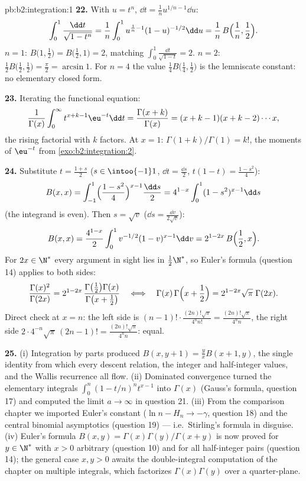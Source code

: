 \begin{solution}{pb:b2:integration:1}
\textbf{22.} With $u = t^n$, $\dd t = \frac1n u^{1/n - 1}\dd
u$:
\[
\int_0^1 \frac{\dd t}{\sqrt{1-t^n}}
= \frac1n\int_0^1 u^{\frac1n-1}(1-u)^{-1/2}\dd u
= \frac1n\,B\Bigl(\frac1n, \frac12\Bigr) .
\]
$n = 1$: $B\bigl(1,\frac12\bigr) = B\bigl(\frac12,1\bigr) = 2$,
matching $\int_0^1\frac{\dd t}{\sqrt{1-t}} = 2$. $n = 2$:
$\frac12 B\bigl(\frac12,\frac12\bigr) = \frac\pi2 = \arcsin 1$.
For $n = 4$ the value $\frac14 B\bigl(\frac14,\frac12\bigr)$ is
the lemniscate constant: no elementary closed form.

\textbf{23.} Iterating the functional equation:
\[
\frac{1}{\Gamma(x)}\int_0^\infty t^{x+k-1}\eu^{-t}\dd t
= \frac{\Gamma(x+k)}{\Gamma(x)}
= (x+k-1)(x+k-2)\cdots x ,
\]
the rising factorial with $k$ factors. At $x = 1$:
$\Gamma(1+k)/\Gamma(1) = k!$, the moments of $\eu^{-t}$ from
\cref{exo:b2:integration:2}.

\textbf{24.} Substitute $t = \frac{1+s}2$ ($s \in
\intoo{-1}1$, $\dd t = \frac{\dd s}2$, $t(1-t) =
\frac{1-s^2}4$):
\[
B(x,x) = \int_{-1}^{1}\Bigl(\frac{1-s^2}{4}\Bigr)^{x-1}
\frac{\dd s}{2}
= 4^{1-x}\int_0^1 (1-s^2)^{x-1}\dd s
\]
(the integrand is even). Then $s = \sqrt v$ ($\dd s =
\frac{\dd v}{2\sqrt v}$):
\[
B(x,x) = \frac{4^{1-x}}{2}\int_0^1
v^{-1/2}(1-v)^{x-1}\dd v
= 2^{1-2x}\,B\Bigl(\frac12, x\Bigr) .
\]
For $2x \in \N^*$ every argument in sight lies in
$\frac12\N^*$, so Euler's formula (question 14) applies to both
sides:
\[
\frac{\Gamma(x)^2}{\Gamma(2x)}
= 2^{1-2x}\,
\frac{\Gamma\bigl(\frac12\bigr)\Gamma(x)}
{\Gamma\bigl(x+\frac12\bigr)}
\quad\Longleftrightarrow\quad
\Gamma(x)\,\Gamma\Bigl(x+\frac12\Bigr)
= 2^{1-2x}\sqrt\pi\;\Gamma(2x) .
\]
Direct check at $x = n$: the left side is $(n-1)!\cdot
\frac{(2n)!\sqrt\pi}{4^n n!} = \frac{(2n)!\sqrt\pi}{4^n n}$,
the right side $2\cdot4^{-n}\sqrt\pi\,(2n-1)! =
\frac{(2n)!\sqrt\pi}{4^n n}$: equal.

\textbf{25.} (i) Integration by parts produced $B(x,y+1) =
\frac yx B(x+1,y)$, the single identity from which every
descent relation, the integer and half-integer values, and the
Wallis recurrence all flow. (ii) Dominated convergence turned
the elementary integrals $\int_0^n(1-t/n)^n t^{x-1}$ into
$\Gamma(x)$ (Gauss's formula, question 17) and computed the
limit $a \to \infty$ in question 21. (iii) From the comparison
chapter we imported Euler's constant ($\ln n - H_n \to
-\gamma$, question 18) and the central binomial asymptotics
(question 19) --- i.e.\ Stirling's formula in disguise. (iv)
Euler's formula $B(x,y) = \Gamma(x)\Gamma(y)/\Gamma(x+y)$ is
now proved for $y \in \N^*$ with $x > 0$ arbitrary (question
10) and for all half-integer pairs (question 14); the general
case $x, y > 0$ awaits the double-integral computation of the
chapter on multiple integrals, which factorizes
$\Gamma(x)\Gamma(y)$ over a quarter-plane.
\end{solution}
